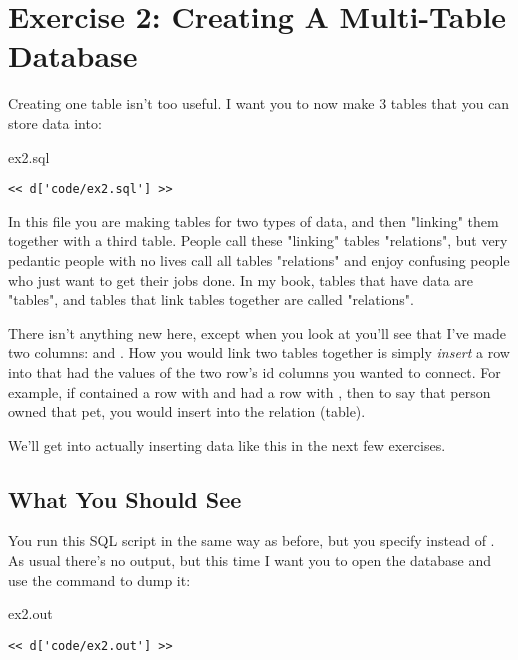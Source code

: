 \chapter{Exercise 2: Creating A Multi-Table Database}

Creating one table isn't too useful.  I want you to now make 3 tables that 
you can store data into:

\begin{code}{ex2.sql}
\begin{Verbatim}
<< d['code/ex2.sql'] >>
\end{Verbatim}
\end{code}

In this file you are making tables for two types of data, and then
"linking" them together with a third table.  People call these 
"linking" tables "relations", but very pedantic people with no
lives call all tables "relations" and enjoy confusing people who
just want to get their jobs done.  In my book, tables that have data
are "tables", and tables that link tables together are called "relations".

There isn't anything new here, except when you look at 
you'll see that I've made two columns:  and .
How you would link two tables together is simply \emph{insert} a row
into  that had the values of the two row's id columns
you wanted to connect.  For example, if  contained a row with
 and  had a row with , then to say
that person owned that pet, you would insert 
into the  relation (table).

We'll get into actually inserting data like this in the next few exercises.

\section{What You Should See}

You run this SQL script in the same way as before, but you specify
 instead of .  As usual there's no output,
but this time I want you to open the database and use the 
 command to dump it:

\begin{code}{ex2.out}
\begin{Verbatim}
<< d['code/ex2.out'] >>
\end{Verbatim}
\end{code}

